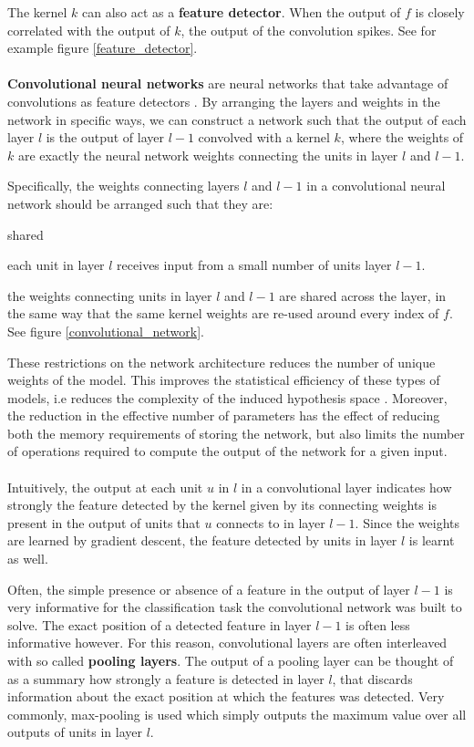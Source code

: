 The kernel $k$ can also act as a \textbf{feature detector}. When the output of $f$ is closely correlated with the output of $k$, the output of the convolution spikes. See for example figure \ref{feature_detector}.
\\\\
\textbf{Convolutional neural networks} are neural networks that take advantage of convolutions as feature detectors \citep{lecun1989}. By arranging the layers and weights in the network in specific ways, we can construct a network such that the output of each layer $l$ is the output of layer $l - 1$ convolved with a kernel $k$, where the weights of $k$ are exactly the neural network weights connecting the units in layer $l$ and $l - 1$.

Specifically, the weights connecting layers $l$ and $l - 1$ in a convolutional neural network should be arranged such that they are:

\begin{labeling}{shared}
	\item [\textbf{sparse}] each unit in layer $l$ receives input from a small number of units layer $l - 1$.
	\item [\textbf{shared}] the weights connecting units in layer $l$ and $l - 1$ are shared across the layer, in the same way that the same kernel weights are re-used around every index of $f$. See figure \ref{convolutional_network}.
\end{labeling}

These restrictions on the network architecture reduces the number of unique weights of the model. This improves the statistical efficiency of these types of models, i.e reduces the complexity of the induced hypothesis space \citep{goodfellow16}. Moreover, the reduction in the effective number of parameters has the effect of reducing both the memory requirements of storing the network, but also limits the number of operations required to compute the output of the network for a given input.
\\\\
Intuitively, the output at each unit $u$ in $l$ in a convolutional layer indicates how strongly the feature detected by the kernel given by its connecting weights is present in the output of units that $u$ connects to in layer $l - 1$. Since the weights are learned by gradient descent, the feature detected by units in layer $l$ is learnt as well.

Often, the simple presence or absence of a feature in the output of layer $l - 1$ is very informative for the classification task the convolutional network was built to solve. The exact position of a detected feature in layer $l - 1$ is often less informative however. For this reason, convolutional layers are often interleaved with so called \textbf{pooling layers}. The output of a pooling layer can be thought of as a summary how strongly a feature is detected in layer $l$, that discards information about the exact position at which the features was detected. Very commonly, max-pooling is used which simply outputs the maximum value over all outputs of units in layer $l$.

